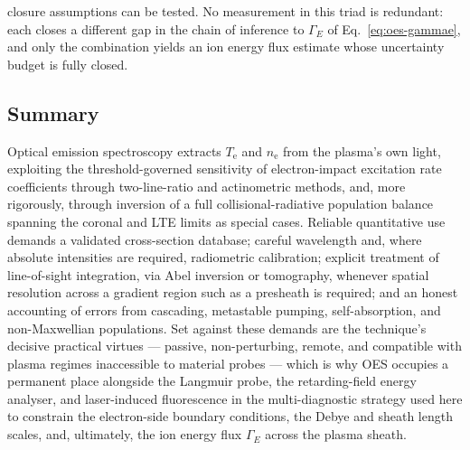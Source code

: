closure assumptions can be tested. No measurement in this triad is redundant: each closes a different gap in the chain of inference to $\Gamma_{E}$ of Eq.~\eqref{eq:oes-gammae}, and only the combination yields an ion energy flux estimate whose uncertainty budget is fully closed.

\subsection{Summary}

Optical emission spectroscopy extracts $T_{\mathrm{e}}$ and $n_{\mathrm{e}}$ from the plasma's own light, exploiting the threshold-governed sensitivity of electron-impact excitation rate coefficients through two-line-ratio and actinometric methods, and, more rigorously, through inversion of a full collisional-radiative population balance spanning the coronal and LTE limits as special cases. Reliable quantitative use demands a validated cross-section database; careful wavelength and, where absolute intensities are required, radiometric calibration; explicit treatment of line-of-sight integration, via Abel inversion or tomography, whenever spatial resolution across a gradient region such as a presheath is required; and an honest accounting of errors from cascading, metastable pumping, self-absorption, and non-Maxwellian populations. Set against these demands are the technique's decisive practical virtues — passive, non-perturbing, remote, and compatible with plasma regimes inaccessible to material probes — which is why OES occupies a permanent place alongside the Langmuir probe, the retarding-field energy analyser, and laser-induced fluorescence in the multi-diagnostic strategy used here to constrain the electron-side boundary conditions, the Debye and sheath length scales, and, ultimately, the ion energy flux $\Gamma_{E}$ across the plasma sheath.
